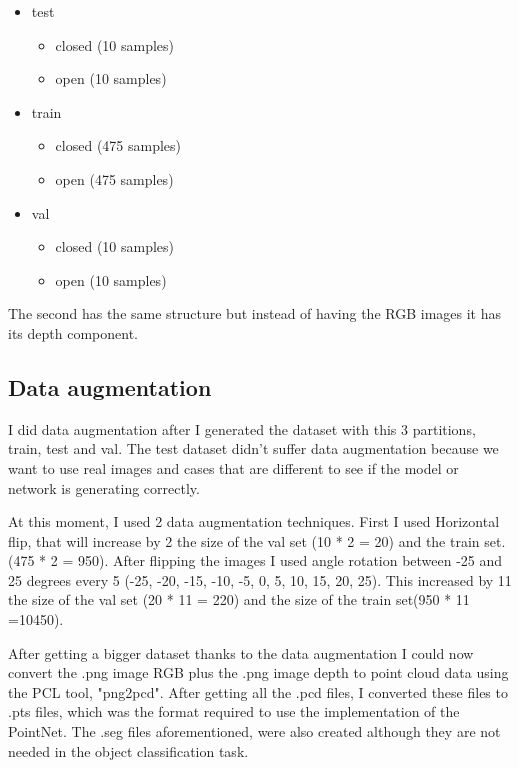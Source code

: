     \begin{itemize}
        \item test
        \begin{itemize}
            \item closed (10 samples)
            \item open   (10 samples)
        \end{itemize}
        \item train
        \begin{itemize}
            \item closed (475 samples)
            \item open   (475 samples)
        \end{itemize}
        \item val
        \begin{itemize}
            \item closed (10 samples)
            \item open   (10 samples)
        \end{itemize}
    \end{itemize}
    
    The second has the same structure but instead of having the RGB images it has its depth component.
    
    \bigskip
    
    \subsection{Data augmentation}
    I did data augmentation after I generated the dataset with this 3 partitions, train, test and val. The test dataset didn't suffer data augmentation because we want to use real images and cases that are different to see if the model or network is generating correctly.
    
    At this moment, I used 2 data augmentation techniques. First I used Horizontal flip, that will increase by 2 the size of the val set (10 * 2 = 20) and the train set. (475 * 2 = 950). After flipping the images I used angle rotation between -25 and 25 degrees every 5 (-25, -20, -15, -10, -5, 0, 5, 10, 15, 20, 25). This increased by 11 the size of the val set (20 * 11 = 220) and the size of the train set(950 * 11 =10450).
    
    \bigskip
    
    After getting a bigger dataset thanks to the data augmentation I could now convert the .png image RGB plus the .png image depth to point cloud data using the PCL tool, "png2pcd". After getting all the .pcd files, I converted these files to .pts files, which was the format required to use the implementation of the PointNet. The .seg files aforementioned, were also created although they are not needed in the object classification task.
    
